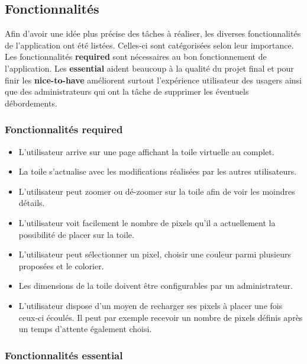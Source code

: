 \subsection{Fonctionnalités}

Afin d'avoir une idée plus précise des tâches à réaliser, les diverses fonctionnalités de l'application ont été listées. Celles-ci sont catégorisées selon leur importance. Les fonctionnalités \textbf{required} sont nécessaires au bon fonctionnement de l'application. Les \textbf{essential} aident beaucoup à la qualité du projet final et pour finir les \textbf{nice-to-have} améliorent surtout l'expérience utilisateur des usagers ainsi que des administrateurs qui ont la tâche de supprimer les éventuels débordements.

\subsubsection{Fonctionnalités \guillemotleft required\guillemotright}

\begin{itemize}
  \item L'utilisateur arrive sur une page affichant la toile virtuelle au complet.
  \item La toile s'actualise avec les modifications réalisées par les autres utilisateurs.
  \item L'utilisateur peut zoomer ou dé-zoomer sur la toile afin de voir les moindres détails.
  \item L'utilisateur voit facilement le nombre de pixels qu'il a actuellement la possibilité de placer sur la toile.
  \item L'utilisateur peut sélectionner un pixel, choisir une couleur parmi plusieurs proposées et le colorier.
  \item Les dimensions de la toile doivent être configurables par un administrateur.
  \item L'utilisateur dispose d'un moyen de recharger ses pixels à placer une fois ceux-ci écoulés. Il peut par exemple recevoir un nombre de pixels définis après un temps d'attente également choisi.
\end{itemize}

\subsubsection{Fonctionnalités \guillemotleft essential\guillemotright}

